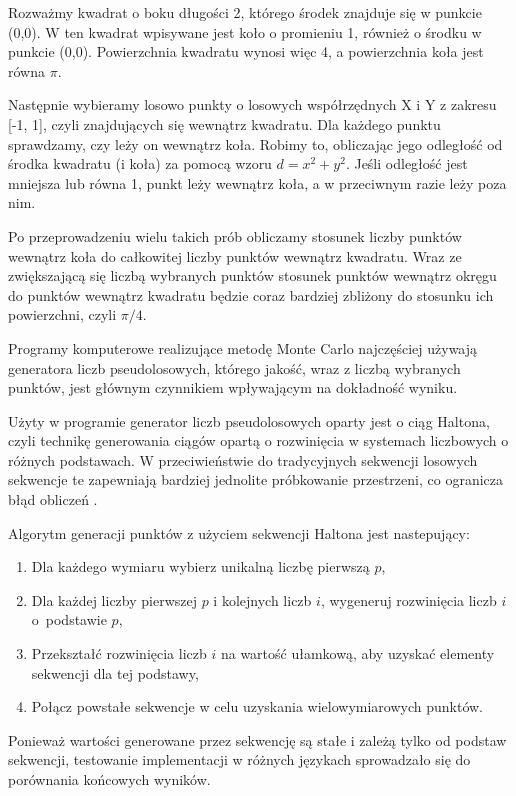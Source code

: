 Rozważmy kwadrat o boku długości 2, którego środek znajduje się w punkcie (0,0). W ten kwadrat wpisywane
jest koło o promieniu 1, również o środku w punkcie (0,0). Powierzchnia kwadratu wynosi więc 4, a
powierzchnia koła jest równa $\pi$.

Następnie wybieramy losowo punkty o losowych współrzędnych X i Y z zakresu [-1, 1], czyli znajdujących
się wewnątrz kwadratu. Dla każdego punktu sprawdzamy, czy leży on wewnątrz koła. Robimy to, obliczając
jego odległość od środka kwadratu (i koła) za pomocą wzoru \(d = x^2 + y^2\). Jeśli odległość
jest mniejsza lub równa 1, punkt leży wewnątrz koła, a w przeciwnym razie leży poza nim.

Po przeprowadzeniu wielu takich prób obliczamy stosunek liczby punktów wewnątrz koła do
całkowitej liczby punktów wewnątrz kwadratu. Wraz ze zwiększającą się liczbą wybranych
punktów stosunek punktów wewnątrz okręgu do punktów wewnątrz kwadratu będzie coraz
bardziej zbliżony do stosunku ich powierzchni, czyli \(\pi / 4\).

Programy komputerowe realizujące metodę Monte Carlo najczęściej używają generatora liczb
pseudolosowych, którego jakość, wraz z liczbą wybranych punktów, jest głównym czynnikiem
wpływającym na dokładność wyniku.

Użyty w programie generator liczb pseudolosowych oparty jest o ciąg Haltona, czyli
technikę generowania ciągów opartą o rozwinięcia w systemach liczbowych o różnych podstawach.
W przeciwieństwie do tradycyjnych sekwencji losowych sekwencje te zapewniają bardziej
jednolite próbkowanie przestrzeni, co ogranicza błąd obliczeń \cite{monte-carlo}.

Algorytm generacji punktów z użyciem sekwencji Haltona jest nastepujący:
\begin{enumerate}
	\item Dla każdego wymiaru wybierz unikalną liczbę pierwszą \( p \),
	\item Dla każdej liczby pierwszej \( p \) i kolejnych liczb \( i \),
	      wygeneruj rozwinięcia liczb \( i \) o~podstawie \( p \),
	\item Przekształć rozwinięcia liczb \( i \) na wartość ułamkową, aby uzyskać
	      elementy sekwencji dla tej podstawy,
	\item Połącz powstałe sekwencje w celu uzyskania wielowymiarowych punktów.
\end{enumerate}

Ponieważ wartości generowane przez sekwencję są stałe i zależą tylko od podstaw sekwencji,
testowanie implementacji w różnych językach sprowadzało się do porównania końcowych wyników.

